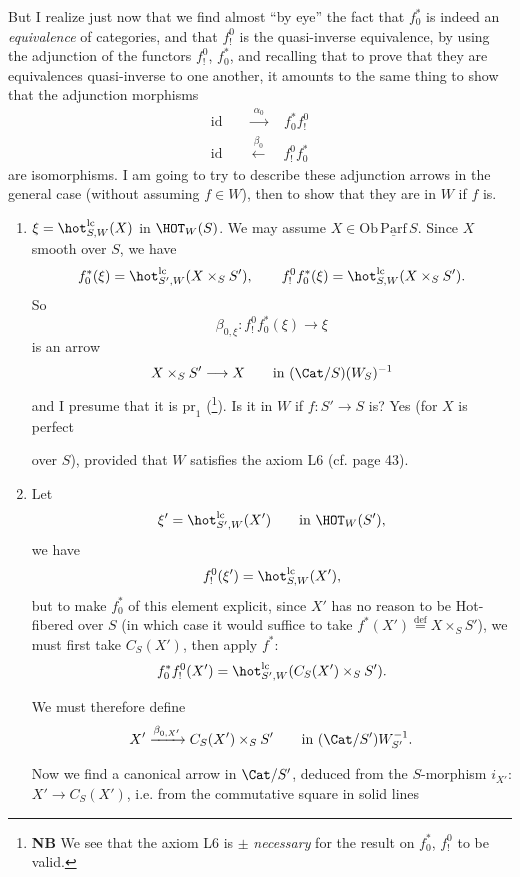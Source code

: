 But I realize just now that we find almost ``by eye'' the fact that $f_0^*$ is indeed an \textit{equivalence} of categories, and that $f_!^0$ is the quasi-inverse equivalence, by using the adjunction of the functors $f_!^0$, $f_0^*$, and recalling that to prove that they are equivalences quasi-inverse to one another, it amounts to the same thing to show that the adjunction morphisms
\[\begin{aligned}
\mathrm{id}&\quad\xrightarrow{\ \alpha_0\ }\quad f_0^*f_!^0\\
\mathrm{id}&\quad\xleftarrow{\ \beta_0\ }\quad f_!^0f_0^*
\end{aligned}\]
are isomorphisms. I am going to try to describe these adjunction arrows in the general case (without assuming $f\in W$), then to show that they are in $W$ if $f$ is.

\begin{enumerate}
\item[] $\xi=\hot^{\mathrm{lc}}_{S,W}(X)$ in $\HOT_W(S)$. We may assume $X\in\mathrm{Ob}\,\underline{\mathrm{Parf}}\,S$. Since $X$ smooth over $S$, we have
\[f_0^*(\xi)=\hot^{\mathrm{lc}}_{S',W}(X\times_S S'),\qquad f_!^0f_0^*(\xi)=\hot^{\mathrm{lc}}_{S,W}(X\times_S S').\]
So
\[\beta_{0,\xi} : f_!^0f_0^*(\xi)\longrightarrow\xi\]
is an arrow
\[X\times_S S'\longrightarrow X\qquad\text{in }(\Cat/S)(W_S)^{-1}\]
and I presume that it is $\mathrm{pr}_1$ (\footnote[78]{\textbf{NB} We see that the axiom L6 is $\pm$ \textit{necessary} for the result on $f_0^*$, $f_!^0$ to be valid.}). Is it in $W$ if $f : S'\longrightarrow S$ is? Yes (for $X$ is perfect


over $S$), provided that $W$ satisfies the axiom L6 (cf. page 43).

\item[2)] Let
\[\xi'=\hot^{\mathrm{lc}}_{S',W}(X')\qquad\text{in }\HOT_W(S'),\]
we have
\[f_!^0(\xi')=\hot^{\mathrm{lc}}_{S,W}(X'),\]
but to make $f_0^*$ of this element explicit, since $X'$ has no reason to be Hot-fibered over $S$ (in which case it would suffice to take $f^*(X')\overset{\text{def}}{=}X\times_S S'$), we must first take $C_S(X')$, then apply $f^*$:
\[f_0^*f_!^0(X')=\hot^{\mathrm{lc}}_{S',W}(C_S(X')\times_S S').\]

We must therefore define
\[X'\xrightarrow{\beta_{0,X'}}C_S(X')\times_S S'\qquad\text{in }(\Cat/S')W_{S'}^{-1}.\]

Now we find a canonical arrow in $\Cat/S'$, deduced from the $S$-morphism $i_{X'}$: $X'\longrightarrow C_S(X')$, i.e. from the commutative square in solid lines
\end{enumerate}
